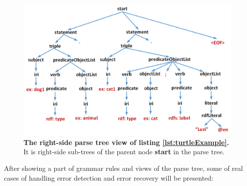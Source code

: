 \begin{figure}
		\includegraphics[width=1\linewidth]{images/implementationParseTreeRight.png}
	\caption{\textbf{The right-side parse tree view of listing \ref{lst:turtleExample}.} It is right-side sub-trees of the parent node \textbf{start} in the parse tree.}
	\label{Fig:implementationParseTreeRight}

\end{figure}

After showing a part of grammar rules and views of the parse tree, some of real cases of handling error detection and error recovery will be presented:


